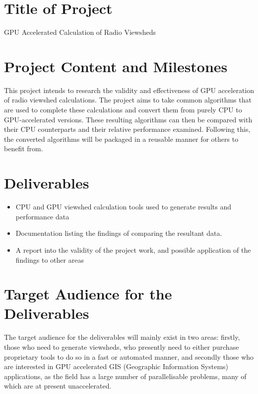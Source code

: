 \documentclass[a4paper]{article}
\begin{document}
    \section{Title of Project}
        GPU Accelerated Calculation of Radio Viewsheds

    \section{Project Content and Milestones}
        This project intends to research the validity and effectiveness of GPU acceleration of radio viewshed
        calculations. The project aims to take common algorithms that are used to complete these calculations and
        convert them from purely CPU to GPU-accelerated versions. These resulting algorithms can then be compared with
        their CPU counterparts and their relative performance examined. Following this, the converted algorithms will
        be packaged in a reusable manner for others to benefit from.
    \section{Deliverables}
        \begin{itemize}
            \item CPU and GPU viewshed calculation tools used to generate results and performance data
            \item Documentation listing the findings of comparing the resultant data.
            \item A report into the validity of the project work, and possible application of the findings to other
                    areas
        \end{itemize}
    \section{Target Audience for the Deliverables}
        The target audience for the deliverables will mainly exist in two areas: firstly, those who need to generate
        viewsheds, who presently need to either purchase proprietary tools to do so in a fast or automated manner, and
        secondly those who are interested in GPU accelerated GIS (Geographic Information Systems) applications, as the
        field has a large number of parallelisable problems, many of which are at present unaccelerated.
\end{document}
